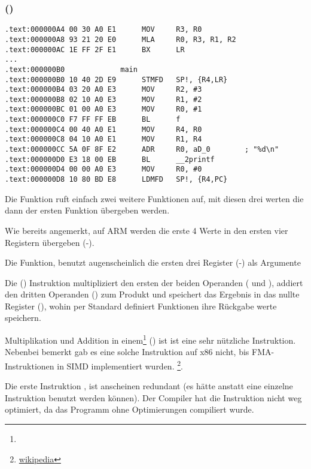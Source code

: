 \subsubsection{\NonOptimizingKeilVI (\ARMMode)}

\begin{lstlisting}[style=customasmARM]
.text:000000A4 00 30 A0 E1      MOV     R3, R0
.text:000000A8 93 21 20 E0      MLA     R0, R3, R1, R2
.text:000000AC 1E FF 2F E1      BX      LR
...
.text:000000B0             main
.text:000000B0 10 40 2D E9      STMFD   SP!, {R4,LR}
.text:000000B4 03 20 A0 E3      MOV     R2, #3
.text:000000B8 02 10 A0 E3      MOV     R1, #2
.text:000000BC 01 00 A0 E3      MOV     R0, #1
.text:000000C0 F7 FF FF EB      BL      f
.text:000000C4 00 40 A0 E1      MOV     R4, R0
.text:000000C8 04 10 A0 E1      MOV     R1, R4
.text:000000CC 5A 0F 8F E2      ADR     R0, aD_0        ; "%d\n"
.text:000000D0 E3 18 00 EB      BL      __2printf
.text:000000D4 00 00 A0 E3      MOV     R0, #0
.text:000000D8 10 80 BD E8      LDMFD   SP!, {R4,PC}
\end{lstlisting}

Die \main Funktion ruft einfach zwei weitere Funktionen auf, mit diesen drei werten die dann
der ersten Funktion übergeben werden.

Wie bereits angemerkt, auf ARM werden die erste 4 Werte in den ersten vier Registern übergeben (-).

Die \ttf Funktion, benutzt augenscheinlich die ersten drei Register (-) als Argumente


Die  ()
Instruktion multipliziert den ersten der beiden Operanden ( und ), addiert den dritten Operanden
() zum Produkt und speichert das Ergebnis in das nullte Register (), wohin per Standard definiert
Funktionen ihre Rückgabe werte speichern.

Multiplikation und Addition in einem\footnote{\WPMAO} ()
ist ist eine sehr nützliche Instruktion. Nebenbei bemerkt gab es eine solche Instruktion 
auf x86 nicht, bis FMA-Instruktionen in SIMD implementiert wurden.
\footnote{\href{http://go.yurichev.com/17103}{wikipedia}}.

Die erste Instruktion ,
ist anscheinen redundant (es hätte anstatt eine einzelne  Instruktion benutzt werden können).
Der Compiler hat die Instruktion nicht weg optimiert, da das Programm ohne Optimierungen compiliert wurde.

